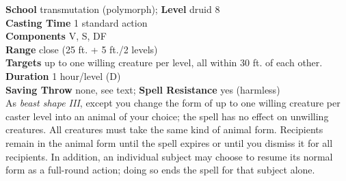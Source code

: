 \textbf{School }transmutation (polymorph); \textbf{Level }druid 8\\
\textbf{Casting Time }1 standard action\\
\textbf{Components }V, S, DF\\
\textbf{Range }close (25 ft. + 5 ft./2 levels)\\
\textbf{Targets }up to one willing creature per level, all within 30 ft. of each other.\\
\textbf{Duration }1 hour/level (D)\\
\textbf{Saving Throw }none, see text; \textbf{Spell Resistance }yes (harmless)\\
As \textit{beast shape III}, except you change the form of up to one willing creature per caster level into an animal of your choice; the spell has no effect on unwilling creatures. All creatures must take the same kind of animal form. Recipients remain in the animal form until the spell expires or until you dismiss it for all recipients. In addition, an individual subject may choose to resume its normal form as a full-round action; doing so ends the spell for that subject alone.\\
